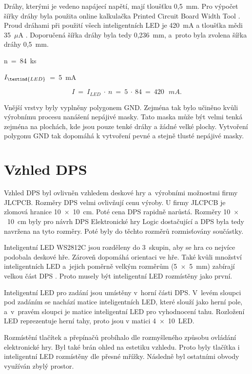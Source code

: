   Dráhy, kterými je vedeno napájecí napětí, mají tloušťku 0,5~mm. Pro výpočet šířky dráhy byla použita online kalkulačka Printed
  Circuit Board Width Tool \cite{Kalkulacka_drahy_DPS}. Proud dráhami při použití všech inteligentních LED je 420~mA a tloušťka 
  mědi 35~$\mu$A \cite{JLCPCB_Capabilities}. Doporučená šířka dráhy byla tedy 0,236~mm, a~proto byla zvolena šířka dráhy 0,5~mm.

  n~=~84~ks

  $I_\textind{LED}$~=~5~mA 

  \begin{equation} 
    I~=~I_{LED}~\cdot~n~=~5~\cdot~84~=~420~\:~mA.
  \end{equation}

  Vnější vrstvy byly vyplněny polygonem GND. Zejména tak bylo učiněno kvůli výrobnímu procesu nanášení nepájivé masky. Tato maska
  může být velmi tenká zejména na plochách, kde jsou pouze tenké dráhy a žádné velké plochy. Vytvoření polygonu GND tak dopomáhá k 
  vytvoření pevné a stejně tlusté nepájivé masky. 

  \newpage
  \section{Vzhled DPS}
  Vzhled DPS byl ovlivněn vzhledem deskové hry a~výrobními možnostmi firmy JLCPCB. Rozměry DPS velmi ovlivňují cenu výroby. U firmy 
  JLCPCB je zlomová hranice 10~$\times$~10~cm. Poté cena DPS rapidně narůstá. Rozměry 10~$\times$~10~cm byly pro návrh DPS Elektronické 
  hry Logic dostačující a DPS byla tedy navržena na tyto rozměry. Poté byly do těchto rozměrů rozmisťovány součástky. 

  Inteligentní LED WS2812C jsou rozděleny do 3~skupin, aby se hra co nejvíce podobala deskové hře. Zároveň dopomáhá orientaci ve hře.
  Také kvůli množství inteligentních LED a~jejich poměrně velkým rozměrům (5~$\times$~5~mm) zabírají velkou část DPS 
  \cite{WS2812C_datasheet}. Proto musely být inteligentní LED rozmístěny jako první.

  Inteligentní LED pro zadání jsou umístěny v~horní části DPS. V~levém sloupci pod zadáním se nachází matice inteligentních LED, které slouží jako herní 
  pole, a~v~pravém sloupci je matice inteligentní LED pro vyhodnocení tahu. Rozložení LED reprezentuje herní tahy, proto jsou v matici 4~$\times$~10~LED.
  
  Rozmístění tlačítek a přepínačů probíhalo dle 
  rozmyšleného způsobu ovládání elektronické hry. Byl také brán ohled na estetiku vzhledu. Proto byly tlačítka i inteligentní LED
  rozmístěny dle přesné mřížky. Následně byl ostatními obvody využíván zbylý prostor. 

